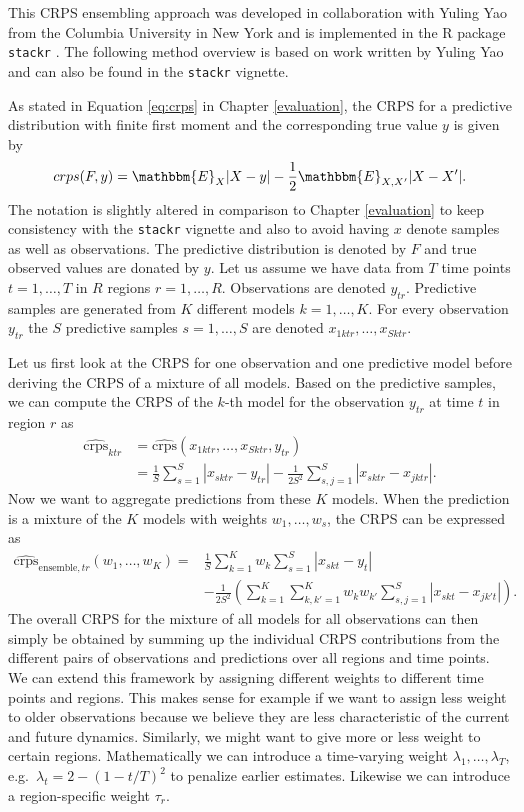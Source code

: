 \documentclass[
]{book}
\renewcommand{\mathbb}{\mathbbm}
\begin{document}
This CRPS ensembling approach was developed in collaboration with Yuling Yao from the Columbia University in New York and is implemented in the R package \texttt{stackr} \citep{R-stackr}. The following method overview is based on work written by Yuling Yao and can also be found in the \texttt{stackr} vignette.

As stated in Equation \eqref{eq:crps} in Chapter \ref{evaluation}, the CRPS for a predictive distribution with finite first moment and the corresponding true value \(y\) is given by
\[crps(F,y)=\mathbb{E}_X|X-y|- \frac{1}{2}\mathbb{E}_{X,X^\prime}|X-X'|.\]
The notation is slightly altered in comparison to Chapter \ref{evaluation} to keep consistency with the \texttt{stackr} vignette and also to avoid having \(x\) denote samples as well as observations. The predictive distribution is denoted by \(F\) and true observed values are donated by \(y\). Let us assume we have data from \(T\) time points \(t = 1, \dots, T\) in \(R\) regions \(r = 1, \dots, R\). Observations are denoted \(y_{tr}\). Predictive samples are generated from \(K\) different models \(k = 1, \dots, K\). For every observation \(y_{tr}\) the \(S\) predictive samples \(s = 1, \dots, S\) are denoted \(x_{1ktr}, \dots, x_{Sktr}\).

Let us first look at the CRPS for one observation and one predictive model before deriving the CRPS of a mixture of all models. Based on the predictive samples, we can compute the CRPS of the \(k\)-th model for the observation \(y_{tr}\) at time \(t\) in region \(r\) as
\begin{align*}
 \widehat {\text{crps}}_{ktr} &= \widehat {\text{crps}}(x_{1ktr}, \dots, x_{Sktr},y_{tr}) \\
 &= \frac{1}{S} \sum_{s=1}^S  |x_{sktr}-y_{tr}| - \frac{1}{2S^2} \sum_{s, j=1}^S |x_{sktr}- x_{jktr}|.
\end{align*}
Now we want to aggregate predictions from these \(K\) models. When the prediction is a mixture of the \(K\)
models with weights \(w_1, \dots, w_s\), the CRPS can be expressed as
\begin{align*}
 \widehat {\text{crps}}_{\text{ensemble}, tr} (w_1, \dots, w_K) 
 =& \frac{1}{S} \sum_{k=1}^K w_k  \sum_{s=1}^S |x_{skt}-y_t| \\
 &- \frac{1}{2S^2}  (\sum_{k=1}^K   \sum_{k, k'=1 }^K w_k w_{k'}   \sum_{s, j=1}^S |x_{skt}- x_{jk't}| ).
\end{align*}
The overall CRPS for the mixture of all models for all observations can then simply be obtained by summing up the individual CRPS contributions from the different pairs of observations and predictions over all regions and time points. We can extend this framework by assigning different weights to different time points and regions. This makes sense for example if we want to assign less weight to older observations because we believe they are less characteristic of the current and future dynamics. Similarly, we might want to give more or less weight to certain regions. Mathematically we can introduce a time-varying weight \(\lambda_1, \dots, \lambda_T\), e.g.~\(\lambda_t = 2-(1-t/T)^2\) to penalize earlier estimates. Likewise we can introduce a region-specific weight \(\tau_r\).
\end{document}

